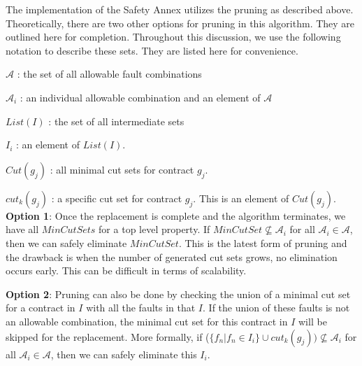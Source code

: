 The implementation of the Safety Annex utilizes the pruning as described above. Theoretically, there are two other options for pruning in this algorithm. They are outlined here for completion. Throughout this discussion, we use the following notation to describe these sets. They are listed here for convenience.

$\mathcal{A}$ : the set of all allowable fault combinations 

$\mathcal{A}_i $ : an individual allowable combination and an element of $\mathcal{A}$

$List(I)$ : the set of all intermediate sets

$I_i$ : an element of $List(I)$. 

$Cut(g_j)$ : all minimal cut sets for contract $g_j$. 

$cut_k(g_j)$ : a specific cut set for contract $g_j$. This is an element of $Cut(g_j)$.  \\

\textbf{Option 1}: Once the replacement is complete and the algorithm terminates, we have all $MinCutSets$ for a top level property. If $MinCutSet \not \subseteq \mathcal{A}_i$ for all $\mathcal{A}_i \in \mathcal{A}$, then we can safely eliminate $MinCutSet$. This is the latest form of pruning and the drawback is when the number of generated cut sets grows, no elimination occurs early. This can be difficult in terms of scalability. 

\textbf{Option 2}: Pruning can also be done by checking the union of a minimal cut set for a contract in $I$ with all the faults in that $I$. If the union of these faults is not an allowable combination, %
the minimal cut set for this contract in $I$ will be skipped for the replacement. More formally, if ($\{f_n | f_n \in I_i\} \cup cut_k(g_j)) \not \subseteq  \mathcal{A}_i $ for all $\mathcal{A}_i \in \mathcal{A}$, then we can safely eliminate this $I_i$. 

































